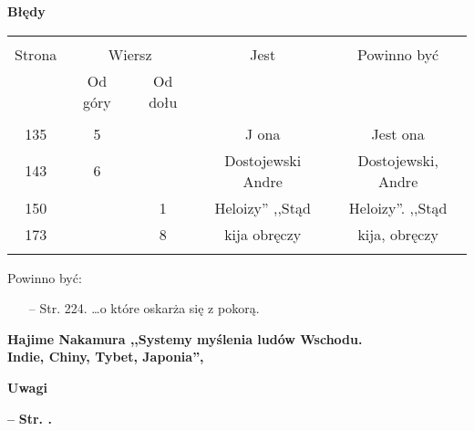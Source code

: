 \documentclass[a4paper,11pt]{article}
\newcommand{\tb}{\textbf}
\newcommand{\noi}{\noindent}
\newcommand{\start}{\noi \tb{--} {}}
\newcommand{\Center}[1]{\begin{center} #1 \end{center}}
\newcommand{\CenterTB}[1]{\Center{\tb{#1}}}
\newcommand{\Str}[1]{\tb{Str. #1.}}
\newcommand{\StrWg}[2]{\tb{Str. #1, wiersz #2.}}
\newcommand{\Jest}{\tb{Jest: }}
\newcommand{\Pow}{\tb{Powinno być: }}
\newcommand{\Work}[1]{ \begin{center} {\large \tb{#1}} \end{center} }
\begin{document}
\CenterTB{Błędy}
\begin{center}
  \begin{tabular}{|c|c|c|c|c|}
    \hline
    & \multicolumn{2}{c|}{} & & \\
    Strona & \multicolumn{2}{c|}{Wiersz}& Jest & Powinno być \\ \cline{2-3}
    & Od góry & Od dołu &  &  \\ \hline
    & & & & \\
    135 & 5 & & J ona & Jest ona \\
    143 & 6 & & Dostojewski Andre & Dostojewski, Andre \\
    150 & & 1 & Heloizy'' ,,Stąd %
           & Heloizy''. ,,Stąd \\ %
    173 & & 8 & kija obręczy & kija, obręczy \\
    & & & & \\ \hline
  \end{tabular}
\end{center}

Powinno być:
\begin{itemize}
\item[--] Str. 224. \ldots o które oskarża się z pokorą.
\end{itemize}





\Work{
  Hajime Nakamura
  ,,Systemy myślenia ludów Wschodu. \\
  Indie, Chiny, Tybet, Japonia'', \cite{Nakamura05} }

\CenterTB{Uwagi}

\start \Str{}

\end{document}
